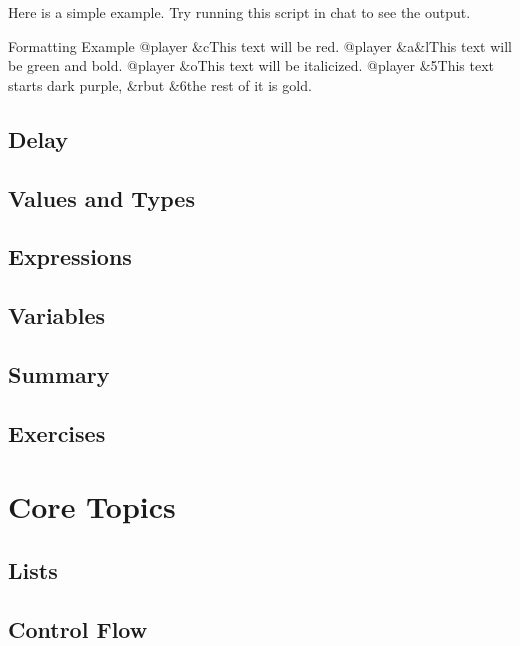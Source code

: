\documentclass[oneside]{book}
\begin{document}
Here is a simple example. Try running this script in chat to see the output.

\begin{msccode}{Formatting Example}
@player &cThis text will be red.
@player &a&lThis text will be green and bold.
@player &oThis text will be italicized.
@player &5This text starts dark purple, &rbut &6the rest of it is gold.
\end{msccode}

\begin{thinkbox}

\end{thinkbox}

\section{Delay}
\blindtext

\section{Values and Types}
\blindtext

\section{Expressions}
\blindtext

\section{Variables}
\blindtext

\section{Summary}
\blindtext

\section{Exercises}
\blindtext

\chapter{Core Topics}
\blindtext

\section{Lists}
\blindtext

\section{Control Flow}
\blindtext
\end{document}
